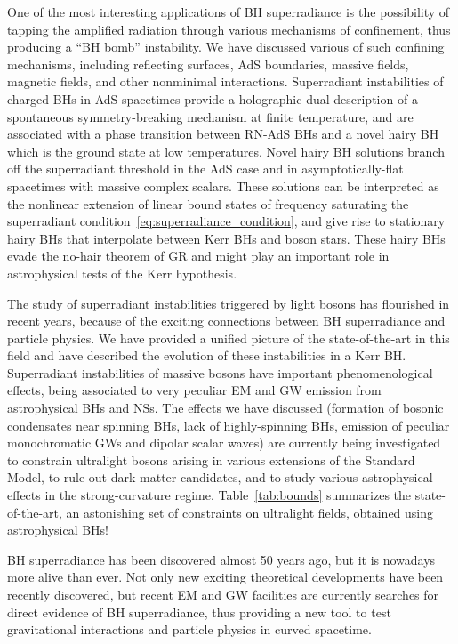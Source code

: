\documentclass[11pt]{article}
\numberwithin{equation}{section} %
\begin{document}
One of the most interesting applications of BH superradiance is the possibility of tapping the amplified radiation 
through various mechanisms of confinement, thus producing a ``BH bomb'' instability. We have discussed various of such 
confining mechanisms, including reflecting surfaces, AdS boundaries, massive fields, magnetic fields, and other 
nonminimal interactions. Superradiant instabilities of charged BHs in AdS spacetimes provide a holographic dual 
description of a spontaneous symmetry-breaking mechanism at finite temperature, and are associated with a phase 
transition between RN-AdS BHs and a novel hairy BH which is the ground state at low temperatures. 
Novel hairy BH solutions branch off the superradiant threshold in the AdS case and in asymptotically-flat spacetimes with massive complex scalars. These solutions can be interpreted as the nonlinear extension of linear bound states of frequency saturating the superradiant condition~\eqref{eq:superradiance_condition}, and give rise to stationary hairy BHs that interpolate between Kerr BHs and boson stars. These hairy BHs evade the no-hair theorem of GR and might play an important role in astrophysical tests of the Kerr hypothesis.


The study of superradiant instabilities triggered by light bosons has flourished in recent years, because of the 
exciting connections between BH superradiance and particle physics. We have provided a unified picture of the 
state-of-the-art in this field and have described the evolution of these instabilities in a Kerr BH. Superradiant 
instabilities of massive bosons have important phenomenological effects, being associated to very peculiar EM and GW 
emission from astrophysical BHs and NSs. The effects we have discussed (formation of bosonic condensates 
near spinning BHs, lack of highly-spinning BHs, emission of peculiar monochromatic GWs and dipolar scalar waves) are currently being investigated to 
constrain ultralight bosons arising in various extensions of the Standard Model, to rule out dark-matter candidates, and 
to study various astrophysical effects in the strong-curvature regime. Table~\ref{tab:bounds} summarizes the state-of-the-art,
an astonishing set of constraints on ultralight fields, obtained using astrophysical BHs! 



BH superradiance has been discovered almost 50 years ago, but it is nowadays more alive than ever. Not only new 
exciting theoretical developments have been recently discovered, but recent EM and GW facilities 
are currently searches for direct evidence of BH superradiance, thus providing a new tool to test 
gravitational interactions and particle physics in curved spacetime. 
%
\end{document}
